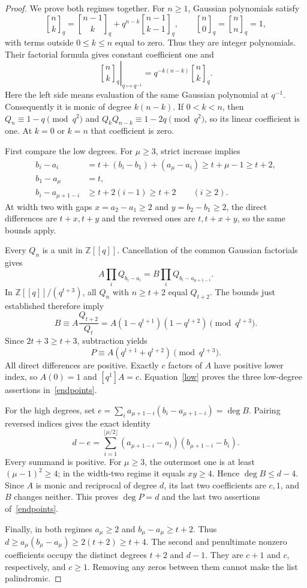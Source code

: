 \documentclass[11pt,a4paper]{article}
\newcommand{\qbin}[2]{\genfrac{[}{]}{0pt}{}{#1}{#2}_{q}}
\newcommand{\coeff}[2]{[q^{#1}]#2}
\begin{document}
\begin{proof}
We prove both regimes together. For $n\ge1$, Gaussian polynomials satisfy
\[
 \qbin{n}{k}=\qbin{n-1}{k}+q^{n-k}\qbin{n-1}{k-1},
 \qquad \qbin{n}{0}=\qbin{n}{n}=1,
\]
with terms outside $0\le k\le n$ equal to zero. Thus they are integer
polynomials. Their factorial formula gives constant coefficient one and
\[
 \left.\qbin{n}{k}\right|_{q\mapsto q^{-1}}=q^{-k(n-k)}\qbin{n}{k}.
\]
Here the left side means evaluation of the same Gaussian polynomial at
$q^{-1}$. Consequently it is monic of degree $k(n-k)$.
If $0<k<n$, then $Q_n\equiv1-q\pmod{q^2}$ and
$Q_kQ_{n-k}\equiv1-2q\pmod{q^2}$, so its linear coefficient is one.
At $k=0$ or $k=n$ that coefficient is zero.

First compare the low degrees. For $\mu\ge3$, strict increase implies
\begin{align*}
 b_i-a_i&=t+(b_i-b_1)+(a_\mu-a_i)\ge t+\mu-1\ge t+2,\\
 b_1-a_\mu&=t,\\
 b_i-a_{\mu+1-i}&\ge t+2(i-1)\ge t+2\qquad(i\ge2).
\end{align*}
At width two with gaps $x=a_2-a_1\ge2$ and $y=b_2-b_1\ge2$,
the direct differences are $t+x,t+y$ and the reversed ones are $t,t+x+y$,
so the same bounds apply.

Every $Q_n$ is a unit in $\mathbb Z[[q]]$. Cancellation of the common
Gaussian factorials gives
\[
 A\prod_i Q_{b_i-a_i}=B\prod_i Q_{b_i-a_{\mu+1-i}}.
\]
In $\mathbb Z[[q]]/(q^{t+3})$, all $Q_n$ with $n\ge t+2$ equal
$Q_{t+2}$. The bounds just established therefore imply
\[
 B\equiv A\frac{Q_{t+2}}{Q_t}
   =A(1-q^{t+1})(1-q^{t+2})\pmod{q^{t+3}}.
\]
Since $2t+3\ge t+3$, subtraction yields
\begin{equation}\label{low}
 P\equiv A(q^{t+1}+q^{t+2})\pmod{q^{t+3}}.
\end{equation}
All direct differences are positive. Exactly $c$ factors of $A$ have
positive lower index, so $A(0)=1$ and $\coeff{1}{A}=c$.
Equation~\eqref{low} proves the three low-degree assertions
in~\eqref{endpoints}.

For the high degrees, set
$e=\sum_i a_{\mu+1-i}(b_i-a_{\mu+1-i})=\deg B$.
Pairing reversed indices gives the exact identity
\begin{equation}\label{gap}
 d-e=\sum_{i=1}^{\lfloor\mu/2\rfloor}
       (a_{\mu+1-i}-a_i)(b_{\mu+1-i}-b_i).
\end{equation}
Every summand is positive. For $\mu\ge3$, the outermost one is at least
$(\mu-1)^2\ge4$; in the width-two regime it equals $xy\ge4$.
Hence $\deg B\le d-4$. Since $A$ is monic and reciprocal of degree $d$,
its last two coefficients are $c,1$, and $B$ changes neither.
This proves $\deg P=d$ and the last two assertions of~\eqref{endpoints}.

Finally, in both regimes $a_\mu\ge2$ and
$b_\mu-a_\mu\ge t+2$. Thus
$d\ge a_\mu(b_\mu-a_\mu)\ge2(t+2)\ge t+4$.
The second and penultimate nonzero coefficients occupy the distinct
degrees $t+2$ and $d-1$. They are $c+1$ and $c$, respectively, and
$c\ge1$. Removing any zeros between them cannot make the list palindromic.
\end{proof}
\end{document}
